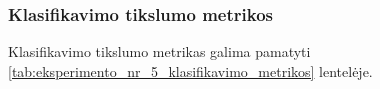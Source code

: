 \subsubsection{Klasifikavimo tikslumo metrikos}
\label{subsubsec:eksperimentas_nr_5_klasifikacijos_tikslumo_metrikos}

Klasifikavimo tikslumo metrikas galima pamatyti \ref{tab:eksperimento_nr_5_klasifikavimo_metrikos} lentelėje.

